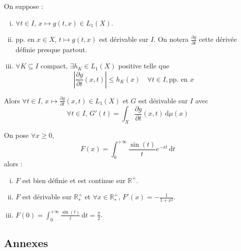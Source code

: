 	\begin{theorem}
		On suppose :
		\begin{enumerate}[(i)]
			\item $\forall t \in I$, $x \mapsto g(t,x) \in L_1(X)$.
			\item pp. en $x \in X$, $t \mapsto g(t,x)$ est dérivable sur $I$. On notera $\frac{\partial g}{\partial t}$ cette dérivée définie presque partout.
			\item $\forall K \subseteq I$ compact, $\exists h_K \in L_1(X)$ positive telle que
			\[ \left| \frac{\partial g}{\partial t}(x,t) \right| \leq h_K(x) \quad \forall t \in I, \text{pp. en } x \]
		\end{enumerate}
		Alors $\forall t \in I$, $x \mapsto \frac{\partial g}{\partial t}(x, t) \in L_1(X)$ et $G$ est dérivable sur $I$ avec
		\[ \forall t \in I, \, G'(t) = \int_X \frac{\partial g}{\partial t}(x, t) \, \mathrm{d}\mu(x) \]
	\end{theorem}


	\begin{application}
		On pose $\forall x \geq 0$,
		\[ F(x) = \int_0^{+\infty} \frac{\sin(t)}{t} e^{-xt} \, \mathrm{d}t \]
		alors :
		\begin{enumerate}[(i)]
			\item $F$ est bien définie et est continue sur $\mathbb{R}^+$.
			\item $F$ est dérivable sur $\mathbb{R}^+_*$ et $\forall x \in \mathbb{R}^+_*$, $F'(x) = -\frac{1}{1+x^2}$.
			\item $F(0) = \int_0^{+\infty} \frac{\sin(t)}{t} \, \mathrm{d}t = \frac{\pi}{2}$.
		\end{enumerate}
	\end{application}

	\newpage
	\subsection*{Annexes}


